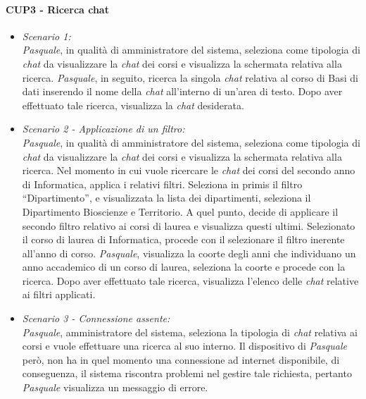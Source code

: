 \paragraph{CUP3 - Ricerca chat\\}
\begin{itemize}
	\item \textit{Scenario 1:\\}
	\textit{Pasquale}, in qualità di amministratore del sistema, seleziona come tipologia di \textit{chat} da visualizzare la \textit{chat} dei corsi e visualizza la schermata relativa alla ricerca.
	\textit{Pasquale}, in seguito, ricerca la singola \textit{chat} relativa al corso di Basi di dati inserendo il nome della \textit{chat} all’interno di un’area di testo. Dopo aver effettuato tale ricerca, visualizza la \textit{chat} desiderata.\\
	
	\item \textit{Scenario 2 - Applicazione di un filtro:\\}
	\textit{Pasquale}, in qualità di amministratore del sistema, seleziona come tipologia di \textit{chat} da visualizzare la \textit{chat} dei corsi e visualizza la schermata relativa alla ricerca. Nel momento in cui vuole ricercare le \textit{chat} dei corsi del secondo anno di Informatica,
	applica i relativi filtri. Seleziona in primis il filtro “Dipartimento”, e visualizzata la lista dei dipartimenti, seleziona il Dipartimento Bioscienze e Territorio. A quel punto, decide di applicare il secondo filtro relativo ai corsi di laurea e visualizza questi ultimi.
	Selezionato il corso di laurea di Informatica, procede con il selezionare il filtro inerente all’anno di corso. \textit{Pasquale}, visualizza la coorte degli anni che individuano un anno accademico di un corso di laurea, seleziona la coorte e procede con la ricerca.
	Dopo aver effettuato tale ricerca, visualizza l’elenco delle \textit{chat} relative ai filtri applicati.\\
	
	\item \textit{Scenario 3 - Connessione assente:\\}
	\textit{Pasquale}, amministratore del sistema, seleziona la tipologia di \textit{chat} relativa ai corsi e vuole effettuare una ricerca al suo interno. 
	Il dispositivo di \textit{Pasquale} però, non ha in quel momento una connessione ad internet disponibile, di conseguenza, il sistema riscontra problemi nel gestire tale richiesta, pertanto \textit{Pasquale} visualizza un messaggio di errore.\\
	

\end{itemize}
